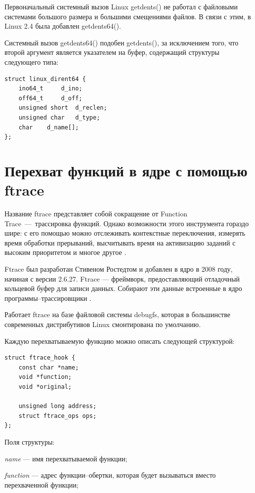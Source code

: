 Первоначальный системный вызов Linux getdents() не работал с файловыми системами большого размера и большими смещениями файлов. В связи с этим, в Linux 2.4 была добавлен getdents64().

Системный вызов getdents64() подобен getdents(), за исключением того, что второй аргумент является указателем на буфер, содержащий структуры следующего типа:

\begin{lstlisting}[label=code:linuxdirent64,caption=Структура linux\_dirent64]
struct linux_dirent64 {
	ino64_t		d_ino;
	off64_t		d_off;    
	unsigned short	d_reclen; 
	unsigned char	d_type;  
	char	d_name[]; 
};
\end{lstlisting}


\section{Перехват функций в ядре с помощью ftrace}

Название ftrace представляет собой сокращение от Function Trace~---~трассировка функций. Однако возможности этого инструмента гораздо шире: с его помощью можно отслеживать контекстные переключения, измерять время обработки прерываний, высчитывать время на активизацию заданий с высоким приоритетом и многое другое \cite{ftrace}.

Ftrace был разработан Стивеном Ростедтом и добавлен в ядро в 2008 году, начиная с версии 2.6.27. Ftrace --- фреймворк, предоставляющий отладочный кольцевой буфер для записи данных. Собирают эти данные встроенные в ядро программы--трассировщики \cite{ftrace}.

Работает ftrace на базе файловой системы debugfs, которая в большинстве современных дистрибутивов Linux смонтирована по умолчанию. 

Каждую перехватываемую функцию можно описать следующей структурой:
\clearpage
\begin{lstlisting}[label=code:ftracehook,caption=Структура ftrace\_hook]
struct ftrace_hook {
	const char *name;
	void *function;
	void *original;
	
	unsigned long address;
	struct ftrace_ops ops;
};
\end{lstlisting}

Поля структуры:

\textit{name} --- имя перехватываемой функции;

\textit{function} ---  адрес функции--обертки, которая будет вызываться вместо перехваченной функции;

